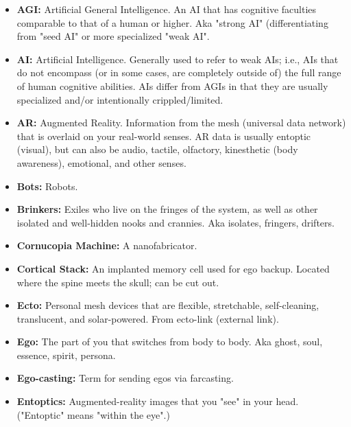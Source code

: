 \begin{itemize}
   \item \textbf{AGI:} Artificial General Intelligence. An AI that has cognitive
      faculties comparable to that of a human or higher. Aka "strong AI"
      (differentiating from "seed AI" or more specialized "weak AI".

   \item \textbf{AI:} Artificial Intelligence. Generally used to refer to weak
      AIs; i.e., AIs that do not encompass (or in some cases, are completely
      outside of) the full range of human cognitive abilities. AIs differ from
      AGIs in that they are usually specialized and/or intentionally
      crippled/limited.

   \item \textbf{AR:} Augmented Reality. Information from the mesh (universal
      data network) that is overlaid on your real-world senses. AR data is
      usually entoptic (visual), but can also be audio, tactile, olfactory,
      kinesthetic (body awareness), emotional, and other senses.

   \item \textbf{Bots:} Robots.

   \item \textbf{Brinkers:} Exiles who live on the fringes of the system,
      as well as other isolated and well-hidden nooks and crannies. Aka
      isolates, fringers, drifters.

   \item \textbf{Cornucopia Machine:} A nanofabricator.

   \item \textbf{Cortical Stack:} An implanted memory cell used for ego
      backup. Located where the spine meets the skull; can be cut out.

   \item \textbf{Ecto:} Personal mesh devices that are flexible,
      stretchable, self-cleaning, translucent, and solar-powered. From
      ecto-link (external link).  

   \item \textbf{Ego:} The part of you that switches from body to body.
      Aka ghost, soul, essence, spirit, persona.  

   \item \textbf{Ego-casting:} Term for sending egos via farcasting.  

   \item \textbf{Entoptics:} Augmented-reality images that you "see" in your
      head. ("Entoptic" means "within the eye".) 


\end{itemize}
